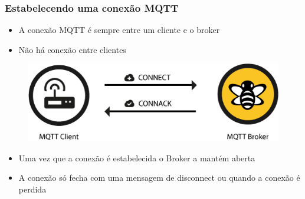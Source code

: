 \documentclass{beamer}
\begin{document}

\begin{frame}
\frametitle{Estabelecendo uma conexão MQTT}

\begin{itemize}
\item A conexão MQTT é sempre entre um cliente e o broker
\item Não há conexão entre clientes
\end{itemize}

\begin{figure}
\centering
\includegraphics[scale=0.5]{MQTT-ConnectionStablishment}
\end{figure}

\begin{itemize}
\item Uma vez que a conexão é estabelecida o Broker a mantém aberta
\item A conexão só fecha com uma mensagem de disconnect ou quando a conexão é perdida
\end{itemize}


\end{frame}

\end{document}
